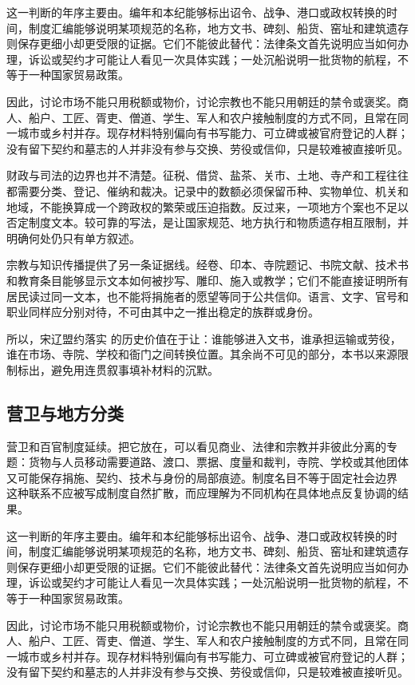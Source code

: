 这一判断的年序主要由。编年和本纪能够标出诏令、战争、港口或政权转换的时间，制度汇编能够说明某项规范的名称，地方文书、碑刻、船货、窑址和建筑遗存则保存更细小却更受限的证据。它们不能彼此替代：法律条文首先说明应当如何办理，诉讼或契约才可能让人看见一次具体实践；一处沉船说明一批货物的航程，不等于一种国家贸易政策。

因此，讨论市场不能只用税额或物价，讨论宗教也不能只用朝廷的禁令或褒奖。商人、船户、工匠、胥吏、僧道、学生、军人和农户接触制度的方式不同，且常在同一城市或乡村并存。现存材料特别偏向有书写能力、可立碑或被官府登记的人群；没有留下契约和墓志的人并非没有参与交换、劳役或信仰，只是较难被直接听见。

财政与司法的边界也并不清楚。征税、借贷、盐茶、关市、土地、寺产和工程往往都需要分类、登记、催纳和裁决。记录中的数额必须保留币种、实物单位、机关和地域，不能换算成一个跨政权的繁荣或压迫指数。反过来，一项地方个案也不足以否定制度文本。较可靠的写法，是让国家规范、地方执行和物质遗存相互限制，并明确何处仍只有单方叙述。

宗教与知识传播提供了另一条证据线。经卷、印本、寺院题记、书院文献、技术书和教育条目能够显示文本如何被抄写、雕印、施入或教学；它们不能直接证明所有居民读过同一文本，也不能将捐施者的愿望等同于公共信仰。语言、文字、官号和职业同样应分别对待，不可由其中之一推出稳定的族群或身份。

所以，宋辽盟约落实 的历史价值在于让：谁能够进入文书，谁承担运输或劳役，谁在市场、寺院、学校和衙门之间转换位置。其余尚不可见的部分，本书以来源限制标出，避免用连贯叙事填补材料的沉默。

\subsection{营卫与地方分类}

营卫和百官制度延续。把它放在，可以看见商业、法律和宗教并非彼此分离的专题：货物与人员移动需要道路、渡口、票据、度量和裁判，寺院、学校或其他团体又可能保存捐施、契约、技术与身份的局部痕迹。制度名目不等于固定社会边界 这种联系不应被写成制度自然扩散，而应理解为不同机构在具体地点反复协调的结果。

这一判断的年序主要由。编年和本纪能够标出诏令、战争、港口或政权转换的时间，制度汇编能够说明某项规范的名称，地方文书、碑刻、船货、窑址和建筑遗存则保存更细小却更受限的证据。它们不能彼此替代：法律条文首先说明应当如何办理，诉讼或契约才可能让人看见一次具体实践；一处沉船说明一批货物的航程，不等于一种国家贸易政策。

因此，讨论市场不能只用税额或物价，讨论宗教也不能只用朝廷的禁令或褒奖。商人、船户、工匠、胥吏、僧道、学生、军人和农户接触制度的方式不同，且常在同一城市或乡村并存。现存材料特别偏向有书写能力、可立碑或被官府登记的人群；没有留下契约和墓志的人并非没有参与交换、劳役或信仰，只是较难被直接听见。

